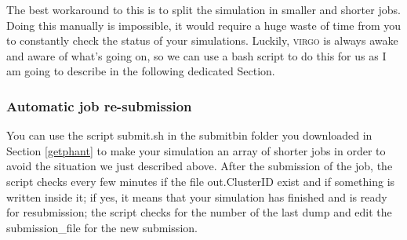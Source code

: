 \documentclass[10pt,a4paper,twoside]{article} %
\begin{document}
The best workaround to this is to split the simulation in smaller and shorter jobs. Doing this manually is impossible, it would require a huge waste of time from you to constantly check the status of your simulations. Luckily, \textsc{virgo} is always awake and aware of what's going on, so we can use a bash script to do this for us as I am going to describe in the following dedicated Section.

\subsubsection{Automatic job re-submission}

You can use the script submit.sh in the submitbin folder you downloaded in Section \ref{getphant} to make your simulation an array of shorter jobs in order to avoid the situation we just described above.
After the submission of the job, the script checks every few minutes if the file out.ClusterID exist and if something is written inside it;
if yes, it means that your simulation has finished and is ready for resubmission; the script checks for the number of the last dump and edit the submission\_file for the new submission. 
\end{document}
